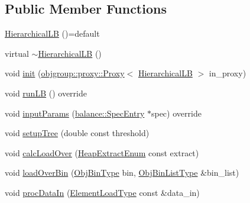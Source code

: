 \subsection*{Public Member Functions}
\begin{DoxyCompactItemize}
\item 
\hyperlink{structvt_1_1vrt_1_1collection_1_1lb_1_1_hierarchical_l_b_ac654b0d8eca15063f5138ec56ebb2bbb}{Hierarchical\+LB} ()=default
\item 
virtual \hyperlink{structvt_1_1vrt_1_1collection_1_1lb_1_1_hierarchical_l_b_aa2b6be5befe22ad9edcf796e9ac91568}{$\sim$\+Hierarchical\+LB} ()
\item 
void \hyperlink{structvt_1_1vrt_1_1collection_1_1lb_1_1_hierarchical_l_b_a3200eb80dca7ad15c7f881dc418f22f7}{init} (\hyperlink{structvt_1_1objgroup_1_1proxy_1_1_proxy}{objgroup\+::proxy\+::\+Proxy}$<$ \hyperlink{structvt_1_1vrt_1_1collection_1_1lb_1_1_hierarchical_l_b}{Hierarchical\+LB} $>$ in\+\_\+proxy)
\item 
void \hyperlink{structvt_1_1vrt_1_1collection_1_1lb_1_1_hierarchical_l_b_a6affae1554d9c0734db0d538b9b26e4d}{run\+LB} () override
\item 
void \hyperlink{structvt_1_1vrt_1_1collection_1_1lb_1_1_hierarchical_l_b_a5648ef8b00795a3ecfb2e07a4ee44345}{input\+Params} (\hyperlink{structvt_1_1vrt_1_1collection_1_1balance_1_1_spec_entry}{balance\+::\+Spec\+Entry} $\ast$spec) override
\item 
void \hyperlink{structvt_1_1vrt_1_1collection_1_1lb_1_1_hierarchical_l_b_ad357ef0c0f5565f7119d4cfd23d119fd}{setup\+Tree} (double const threshold)
\item 
void \hyperlink{structvt_1_1vrt_1_1collection_1_1lb_1_1_hierarchical_l_b_a6fb4de858caf08759fe503b04f4cdded}{calc\+Load\+Over} (\hyperlink{namespacevt_1_1vrt_1_1collection_1_1lb_aeb0f47cf4b89bed7ea05462d0c2e5b5e}{Heap\+Extract\+Enum} const extract)
\item 
void \hyperlink{structvt_1_1vrt_1_1collection_1_1lb_1_1_hierarchical_l_b_a81e03ca1264d0b2cf9b0ee3eef7f792a}{load\+Over\+Bin} (\hyperlink{structvt_1_1vrt_1_1collection_1_1lb_1_1_base_l_b_ae0bff8fcf0dec0abc1d81836cf1d060a}{Obj\+Bin\+Type} bin, \hyperlink{structvt_1_1vrt_1_1collection_1_1lb_1_1_base_l_b_ab29c64ca66a928f34cf638dad6163f80}{Obj\+Bin\+List\+Type} \&bin\+\_\+list)
\item 
void \hyperlink{structvt_1_1vrt_1_1collection_1_1lb_1_1_hierarchical_l_b_afcd789adcc57348b7da92801119bd8f1}{proc\+Data\+In} (\hyperlink{structvt_1_1vrt_1_1collection_1_1lb_1_1_base_l_b_aa286d31a0820a8fc9218ccb858368fca}{Element\+Load\+Type} const \&data\+\_\+in)
\end{DoxyCompactItemize}
